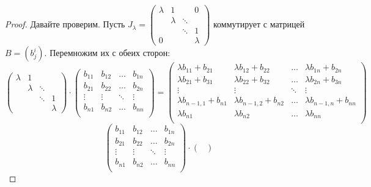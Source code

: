 \begin{proof}
    Давайте проверим. Пусть
    $
    J_\lambda =
    \begin{pmatrix}
        \lambda & 1 & & 0\\
         & \lambda & \ddots & \\
         & & \ddots & 1 \\
        0 & & & \lambda
    \end{pmatrix}
    $ коммутирует с матрицей $B = (b^i_j)$. Перемножим их с обеих сторон:
    \[
    \begin{pmatrix}
        \lambda & 1 & & \\
         & \lambda & \ddots & \\
         & & \ddots & 1 \\
         & & & \lambda
    \end{pmatrix} \cdot
    \begin{pmatrix}
        b_{11} & b_{12} & \ldots & b_{1n}\\
        b_{21} & b_{22} & \ldots & b_{2n}\\
        \vdots & \vdots & \ddots & \vdots\\
        b_{n1} & b_{n2} & \ldots & b_{nn}\\
    \end{pmatrix} =
    \begin{pmatrix}
        \lambda b_{11} + b_{21} & \lambda b_{12} + b_{22} & \ldots & \lambda b_{1n} + b_{2n}\\
        \lambda b_{21} + b_{31} & \lambda b_{22} + b_{32} & \ldots & \lambda b_{2n} + b_{3n}\\
        \vdots & \vdots & \ddots & \vdots\\
        \lambda b_{n - 1, 1} + b_{n1} & \lambda b_{n - 1, 2} + b_{n2} & \ldots & \lambda b_{n - 1, n} + b_{nn}\\
        \lambda b_{n1} & \lambda b_{n2} & \ldots & \lambda b_{nn}\\
    \end{pmatrix}
    \]
    \[
    \begin{pmatrix}
        b_{11} & b_{12} & \ldots & b_{1n}\\
        b_{21} & b_{22} & \ldots & b_{2n}\\
        \vdots & \vdots & \ddots & \vdots\\
        b_{n1} & b_{n2} & \ldots & b_{nn}\\
    \end{pmatrix} \cdot
    \begin{pmatrix}

\end{pmatrix}\]
\end{proof}
